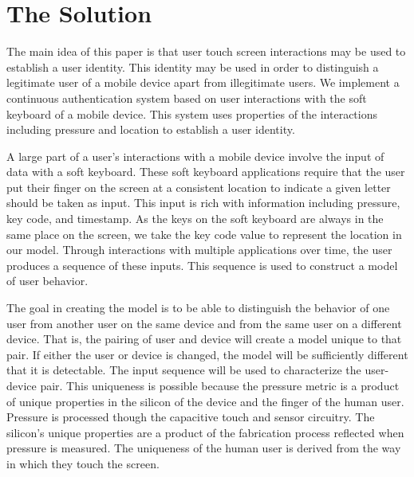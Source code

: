 \section{The Solution}
\label{the_solution}


The main idea of this paper is that user
touch screen interactions may be used 
to establish a user identity.
%
This identity may be used in order to
distinguish a legitimate user of a mobile device apart from
illegitimate users.
%
We implement a continuous authentication system
based on user interactions with the soft keyboard of
a mobile device.
This system uses properties of the interactions including
pressure and location
to establish a user identity.

A large part of a user's interactions with a mobile
device involve the input of data with a soft keyboard.
These soft keyboard applications require that
the user put their finger on the screen at a consistent
location to indicate a given letter should be taken as input.
This input is rich with information including
pressure,
key code, and
timestamp.
As the keys on the soft keyboard are always in the same place on the screen,
we take the key code value to represent the location in our model.
Through interactions with multiple applications over time,
the user produces a sequence of these inputs.
This sequence is used to construct a model of user behavior.

The goal in creating the model
is to be able to distinguish the behavior
of one user from 
another user on the same device and
from the same user on a different device.
That is, the pairing of user and device will
create a model unique to that pair.
If either the user or device is changed,
the model will be sufficiently different
that it is detectable.
The input sequence will be used to characterize the user-device pair.
%
This uniqueness is possible because
the pressure metric is a product of 
unique properties in
the silicon of the device and
the finger of the human user.
%
Pressure is processed though the capacitive touch and sensor circuitry.
The silicon's unique properties
are a product of the fabrication process %
reflected when pressure is measured.
The uniqueness of the human user is derived from
the way in which they touch the screen.

